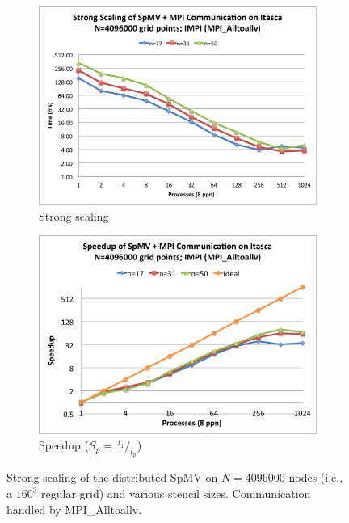 \documentclass{report}
\begin{document}
\begin{figure} 
\centering
\begin{subfigure}{0.48\textwidth}
\centering
\includegraphics[width=\textwidth]{performance_content/scaling/strong_scaling_4M_regular_alltoallv.png}  
\caption{Strong scaling}
\label{fig:strong_scaling_alltoallv_all_stencils}
\end{subfigure}
\begin{subfigure}{0.48\textwidth}
\centering
\includegraphics[width=\textwidth]{performance_content/scaling/strong_scaling_4M_regular_alltoallv_speedup.png}
\caption{Speedup ($S_p = \ ^{t_{1}}/_{t_p}$)}
\label{fig:strong_scaling_speedup_alltoallv_all_stencils}
\end{subfigure}
\caption{Strong scaling of the distributed SpMV on $N=4096000$ nodes (i.e., a $160^3$ regular grid) and various stencil sizes. Communication handled by MPI\_Alltoallv. }
\label{fig:strong_scaling_alltoallv}
\end{figure}
\end{document}
